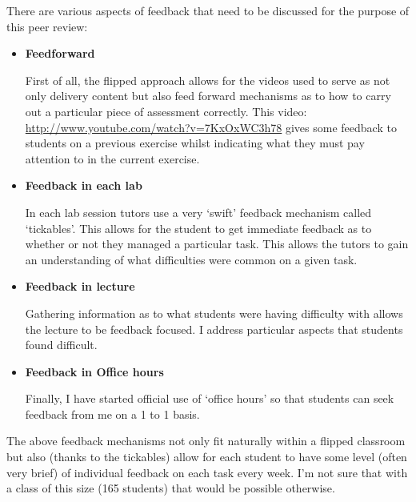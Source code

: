 \documentclass{article}
\begin{document}
There are various aspects of feedback that need to be discussed for the purpose of this peer review:

\begin{itemize}
    \item \textbf{Feedforward}

    First of all, the flipped approach allows for the videos used to serve as not only delivery content but also feed forward mechanisms as to how to carry out a particular piece of assessment correctly. This video: \url{http://www.youtube.com/watch?v=7KxOxWC3h78} gives some feedback to students on a previous exercise whilst indicating what they must pay attention to in the current exercise.

    \item \textbf{Feedback in each lab}

    In each lab session tutors use a very `swift' feedback mechanism called `tickables'. This allows for the student to get immediate feedback as to whether or not they managed a particular task. This allows the tutors to gain an understanding of what difficulties were common on a given task.

    \item \textbf{Feedback in lecture}

    Gathering information as to what students were having difficulty with allows the lecture to be feedback focused. I address particular aspects that students found difficult.

    \item \textbf{Feedback in Office hours}

    Finally, I have started official use of `office hours' so that students can seek feedback from me on a 1 to 1 basis.
\end{itemize}

The above feedback mechanisms not only fit naturally within a flipped classroom but also (thanks to the tickables) allow for each student to have some level (often very brief) of individual feedback on each task every week. I'm not sure that with a class of this size (165 students) that would be possible otherwise.
\end{document}
